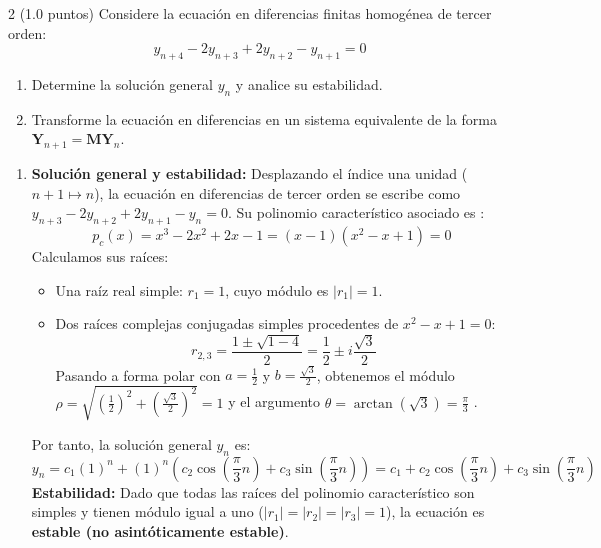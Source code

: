 \begin{ejer}{2 (1.0 puntos)}
Considere la ecuación en diferencias finitas homogénea de tercer orden:
$$y_{n+4} - 2y_{n+3} + 2y_{n+2} - y_{n+1} = 0$$
\begin{enumerate}
    \item Determine la solución general $y_n$ y analice su estabilidad.
    \item Transforme la ecuación en diferencias en un sistema equivalente de la forma $\mathbf{Y}_{n+1} = \mathbf{M}\mathbf{Y}_n$.
\end{enumerate}
\end{ejer}

\begin{sol}
\begin{enumerate}
    \item \textbf{Solución general y estabilidad:}
    Desplazando el índice una unidad ($n+1 \mapsto n$), la ecuación en diferencias de tercer orden se escribe como $y_{n+3} - 2y_{n+2} + 2y_{n+1} - y_n = 0$. Su polinomio característico asociado es :
    $$
    p_c(x) = x^3 - 2x^2 + 2x - 1 = (x - 1)(x^2 - x + 1) = 0
    $$
    Calculamos sus raíces:
    \begin{itemize}
        \item Una raíz real simple: $r_1 = 1$, cuyo módulo es $|r_1| = 1$.
        \item Dos raíces complejas conjugadas simples procedentes de $x^2 - x + 1 = 0$:
        $$
        r_{2,3} = \frac{1 \pm \sqrt{1 - 4}}{2} = \frac{1}{2} \pm i\frac{\sqrt{3}}{2}
        $$
        Pasando a forma polar con $a = \frac{1}{2}$ y $b = \frac{\sqrt{3}}{2}$, obtenemos el módulo $\rho = \sqrt{\left(\frac{1}{2}\right)^2 + \left(\frac{\sqrt{3}}{2}\right)^2} = 1$ y el argumento $\theta = \arctan\left(\sqrt{3}\right) = \frac{\pi}{3}$ .
    \end{itemize}
    Por tanto, la solución general $y_n$ es:
    $$
    y_n = c_1 (1)^n + (1)^n \left( c_2 \cos\left(\frac{\pi}{3}n\right) + c_3 \sin\left(\frac{\pi}{3}n\right) \right) = c_1 + c_2 \cos\left(\frac{\pi}{3}n\right) + c_3 \sin\left(\frac{\pi}{3}n\right)
    $$
    \textbf{Estabilidad:} Dado que todas las raíces del polinomio característico son simples y tienen módulo igual a uno ($|r_1| = |r_2| = |r_3| = 1$), la ecuación es \textbf{estable (no asintóticamente estable)}.


\end{enumerate}
\end{sol}

